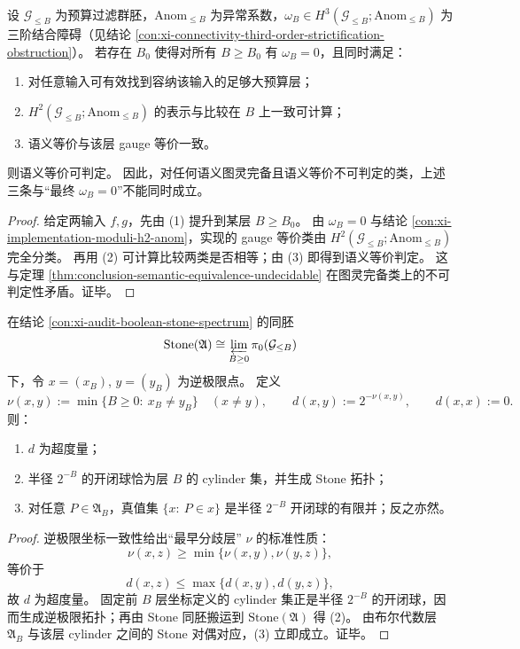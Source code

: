 \begin{theorem}\label{thm:conclusion-turing-completeness-obstructs-eventual-omega-vanishing}
设 \(\mathcal G_{\le B}\) 为预算过滤群胚，\(\mathrm{Anom}_{\le B}\) 为异常系数，\(\omega_B\in H^3(\mathcal G_{\le B};\mathrm{Anom}_{\le B})\) 为三阶结合障碍（见结论 \ref{con:xi-connectivity-third-order-strictification-obstruction}）。
若存在 \(B_0\) 使得对所有 \(B\ge B_0\) 有 \(\omega_B=0\)，且同时满足：
\begin{enumerate}
  \item 对任意输入可有效找到容纳该输入的足够大预算层；
  \item \(H^2(\mathcal G_{\le B};\mathrm{Anom}_{\le B})\) 的表示与比较在 \(B\) 上一致可计算；
  \item 语义等价与该层 gauge 等价一致。
\end{enumerate}
则语义等价可判定。
因此，对任何语义图灵完备且语义等价不可判定的类，上述三条与“最终 \(\omega_B=0\)”不能同时成立。
\end{theorem}
\begin{proof}
给定两输入 \(f,g\)，先由 (1) 提升到某层 \(B\ge B_0\)。
由 \(\omega_B=0\) 与结论 \ref{con:xi-implementation-moduli-h2-anom}，实现的 gauge 等价类由
\(
H^2(\mathcal G_{\le B};\mathrm{Anom}_{\le B})
\)
完全分类。
再用 (2) 可计算比较两类是否相等；由 (3) 即得到语义等价判定。
这与定理 \ref{thm:conclusion-semantic-equivalence-undecidable} 在图灵完备类上的不可判定性矛盾。证毕。
\end{proof}

\begin{proposition}\label{prop:conclusion-budget-filtration-stone-ultrametric}
在结论 \ref{con:xi-audit-boolean-stone-spectrum} 的同胚
\[
\mathrm{Stone}(\mathfrak A)\cong \varprojlim_{B\ge 0}\pi_0(\mathcal G_{\le B})
\]
下，令 \(x=(x_B)\), \(y=(y_B)\) 为逆极限点。
定义
\[
\nu(x,y):=\min\{B\ge 0:\ x_B\neq y_B\}\quad(x\neq y),\qquad
d(x,y):=2^{-\nu(x,y)},\qquad d(x,x):=0.
\]
则：
\begin{enumerate}
  \item \(d\) 为超度量；
  \item 半径 \(2^{-B}\) 的开闭球恰为层 \(B\) 的 cylinder 集，并生成 Stone 拓扑；
  \item 对任意 \(P\in \mathfrak A_B\)，真值集 \(\{x:\ P\in x\}\) 是半径 \(2^{-B}\) 开闭球的有限并；反之亦然。
\end{enumerate}
\end{proposition}
\begin{proof}
逆极限坐标一致性给出“最早分歧层” \(\nu\) 的标准性质：
\[
\nu(x,z)\ge \min\{\nu(x,y),\nu(y,z)\},
\]
等价于
\[
d(x,z)\le \max\{d(x,y),d(y,z)\},
\]
故 \(d\) 为超度量。
固定前 \(B\) 层坐标定义的 cylinder 集正是半径 \(2^{-B}\) 的开闭球，因而生成逆极限拓扑；再由 Stone 同胚搬运到 \(\mathrm{Stone}(\mathfrak A)\) 得 (2)。
由布尔代数层 \(\mathfrak A_B\) 与该层 cylinder 之间的 Stone 对偶对应，(3) 立即成立。证毕。
\end{proof}

